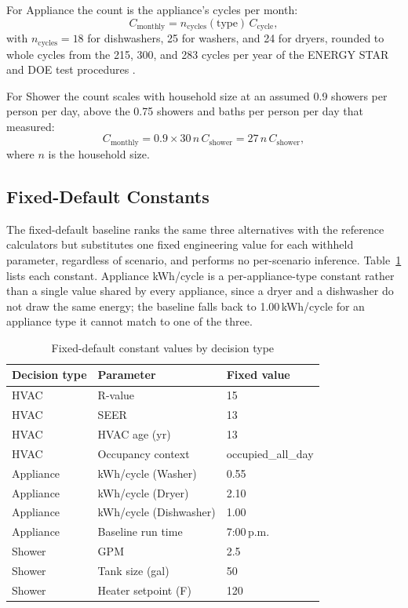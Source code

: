 \documentclass[11pt]{article}
\begin{document}
For Appliance the count is the appliance's cycles per month:
\begin{equation}
C_{\mathrm{monthly}} = n_{\mathrm{cycles}}(\text{type})\,C_{\mathrm{cycle}},
\end{equation}
with $n_{\mathrm{cycles}} = 18$ for dishwashers, 25 for washers, and 24 for dryers, rounded to whole cycles from the 215, 300, and 283 cycles per year of the ENERGY STAR and DOE test procedures \citep{energystar_dishwasher_criteria2023,energystar_clotheswasher,doe_dryer_tp_2011}.

For Shower the count scales with household size at an assumed 0.9 showers per person per day, above the 0.75 showers and baths per person per day that \citet{mayer1999reuw} measured:
\begin{equation}
C_{\mathrm{monthly}} = 0.9 \times 30\,n\,C_{\mathrm{shower}} = 27\,n\,C_{\mathrm{shower}},
\end{equation}
where $n$ is the household size.

\subsection{Fixed-Default Constants}
\label{app:fixed_default}

The fixed-default baseline ranks the same three alternatives with the reference
calculators but substitutes one fixed engineering value for each withheld
parameter, regardless of scenario, and performs no per-scenario inference.
Table~\ref{tab:fixed_default_constants} lists each constant. Appliance
kWh/cycle is a per-appliance-type constant rather than a single value shared
by every appliance, since a dryer and a dishwasher do not draw the same
energy; the baseline falls back to 1.00\,kWh/cycle for an appliance type it
cannot match to one of the three.

\begin{table}[htbp]
\centering
\footnotesize
\caption{Fixed-default constant values by decision type}
\label{tab:fixed_default_constants}
\begin{tabular}{@{}lll@{}}
\toprule
Decision type & Parameter & Fixed value \\
\midrule
HVAC & R-value & 15 \\
HVAC & SEER & 13 \\
HVAC & HVAC age (yr) & 13 \\
HVAC & Occupancy context & occupied\_all\_day \\
Appliance & kWh/cycle (Washer) & 0.55 \\
Appliance & kWh/cycle (Dryer) & 2.10 \\
Appliance & kWh/cycle (Dishwasher) & 1.00 \\
Appliance & Baseline run time & 7:00\,p.m. \\
Shower & GPM & 2.5 \\
Shower & Tank size (gal) & 50 \\
Shower & Heater setpoint (\textdegree{}F) & 120 \\
\bottomrule
\end{tabular}
\end{table}
\end{document}
